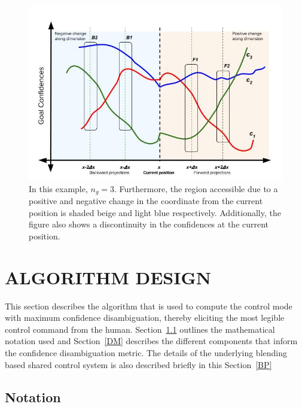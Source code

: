 \documentclass[conference]{IEEEtran}
\begin{document}
\begin{figure}[t]
	\centering
	\includegraphics[width = 0.85\hsize, height = 0.45\vsize]{./figures/DisambMetric.jpg}
	\caption{In this example, $n_g = 3$. Furthermore, the region accessible due to a positive and negative change in the coordinate from the current position is shaded beige and light blue respectively. Additionally, the figure also shows a discontinuity in the confidences at the current position.}
	\label{DM_FIG}
\end{figure}
\section{ALGORITHM DESIGN} \label{ALGO}
This section describes the algorithm that is used to compute the control mode with maximum confidence disambiguation, thereby eliciting the most legible control command from the human. Section~\ref{NOT} outlines the mathematical notation used and Section~\ref{DM} describes the different components that inform the confidence disambiguation metric. The details of the underlying blending based shared control system is also described briefly in this Section~\ref{BP}

\subsection{Notation}\label{NOT}

\end{document}
